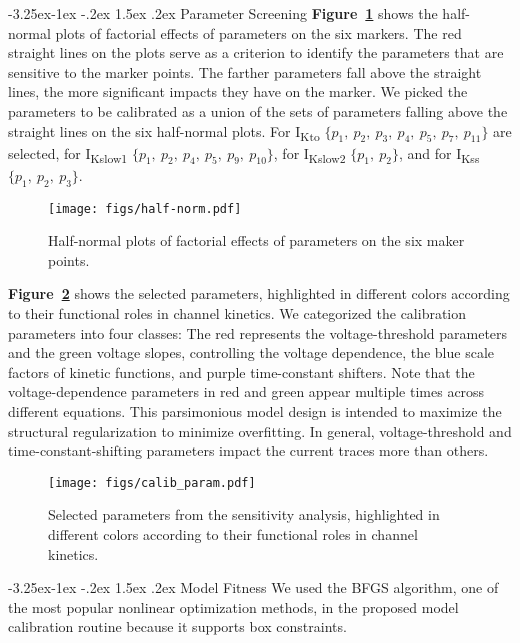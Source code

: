 \documentclass[11pt]{article}
\makeatletter
\renewcommand\subsection{\@startsection{subsection}{2}{\z@}%
                                     {-3.25ex\@plus -1ex \@minus -.2ex}%
                                     {1.5ex \@plus .2ex}%
                                     {\normalfont\fontfamily{phv}\fontsize{14}{17}\bfseries}}
\makeatother
\begin{document}
\subsection{Parameter Screening}
\textbf{Figure~\ref{fig:half-norm}} shows the half-normal plots of factorial effects of parameters on the six markers. The red straight lines on the plots serve as a criterion to identify the parameters that are sensitive to the marker points. The farther parameters fall above the straight lines, the more significant impacts they have on the marker. We picked the parameters to be calibrated as a union of the sets of parameters falling above the straight lines on the six half-normal plots. For I\textsubscript{Kto} $\{p_{1},\ p_{2},\ p_{3},\ p_{4},\ p_{5},\ p_{7},\ p_{11}\}$ are selected, for I\textsubscript{Kslow1} $\{p_{1},\ p_{2},\ p_{4},\ p_{5},\ p_{9},\ p_{10}\}$, for I\textsubscript{Kslow2} $\{p_{1},\ p_{2}\}$, and for I\textsubscript{Kss} $\{p_{1},\ p_{2},\ p_{3}\}$. 
\begin{figure}
    \centering
    \texttt{[image: figs/half-norm.pdf]}
    \caption{Half-normal plots of factorial effects of parameters on the six maker points.}
    \label{fig:half-norm}
\end{figure}
\textbf{Figure~\ref{fig:calib_param}} shows the selected parameters, highlighted in different colors according to their functional roles in channel kinetics. We categorized the calibration parameters into four classes: The red represents the voltage-threshold parameters and the green voltage slopes, controlling the voltage dependence, the blue scale factors of kinetic functions, and purple time-constant shifters. Note that the voltage-dependence parameters in red and green appear multiple times across different equations. This parsimonious model design is intended to maximize the structural regularization to minimize overfitting. In general, voltage-threshold and time-constant-shifting parameters impact the current traces more than others. 
\begin{figure}[!ht]
    \centering
    \texttt{[image: figs/calib\_param.pdf]}
    \caption{Selected parameters from the sensitivity analysis, highlighted in different colors according to their functional roles in channel kinetics.}
    \label{fig:calib_param}
\end{figure}

\subsection{Model Fitness}
We used the BFGS algorithm, one of the most popular nonlinear optimization methods, in the proposed model calibration routine because it supports box constraints.
\end{document}
